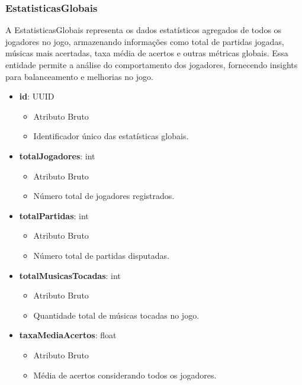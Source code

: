     \subsubsection{EstatisticasGlobais}
    A EstatisticasGlobais representa os dados estatísticos agregados de todos os jogadores no jogo, armazenando informações como total de partidas jogadas, músicas mais acertadas, taxa média de acertos e outras métricas globais. Essa entidade permite a análise do comportamento dos jogadores, fornecendo insights para balanceamento e melhorias no jogo.
    \begin{itemize}
        \item \textbf{id}: UUID  
              \begin{itemize}
                  \item Atributo Bruto
                  \item Identificador único das estatísticas globais.
              \end{itemize}
    
        \item \textbf{totalJogadores}: int  
              \begin{itemize}
                  \item Atributo Bruto
                  \item Número total de jogadores registrados.
              \end{itemize}
    
        \item \textbf{totalPartidas}: int  
              \begin{itemize}
                  \item Atributo Bruto
                  \item Número total de partidas disputadas.
              \end{itemize}
    
        \item \textbf{totalMusicasTocadas}: int  
              \begin{itemize}
                  \item Atributo Bruto
                  \item Quantidade total de músicas tocadas no jogo.
              \end{itemize}
    
        \item \textbf{taxaMediaAcertos}: float  
              \begin{itemize}
                  \item Atributo Bruto
                  \item Média de acertos considerando todos os jogadores.
              \end{itemize}
    

\end{itemize}

